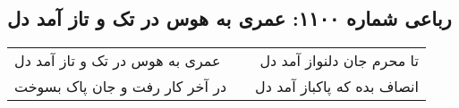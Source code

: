 \begin{center}
\section*{رباعی شماره ۱۱۰۰: عمری به هوس در تک و تاز آمد دل}
\label{sec:1100}
\begin{longtable}{l p{0.5cm} r}
عمری به هوس در تک و تاز آمد دل
&&
تا محرم جان دلنواز آمد دل
\\
در آخر کار رفت و جان پاک بسوخت
&&
انصاف بده که پاکباز آمد دل
\\
\end{longtable}
\end{center}
